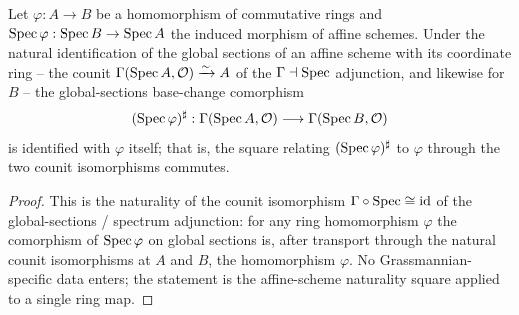 \begin{lemma}\label{mk-lem:gr_baseChange_bridge_gammaSpec}
  \leanok

  Let \(\varphi : A \to B\) be a homomorphism of commutative rings and
  \(\operatorname{Spec}\varphi : \operatorname{Spec} B \to \operatorname{Spec} A\) the induced morphism of affine schemes. Under the
  natural identification of the global sections of an affine scheme with its coordinate ring
  -- the counit \(\Gamma(\operatorname{Spec} A, \mathcal O) \xrightarrow{\sim} A\) of the
  \(\Gamma \dashv \operatorname{Spec}\) adjunction, and likewise for \(B\) -- the global-sections base-change
  comorphism
  \[
    (\operatorname{Spec}\varphi)^{\sharp} : \Gamma(\operatorname{Spec} A, \mathcal O) \longrightarrow \Gamma(\operatorname{Spec} B, \mathcal O)
  \]
  is identified with \(\varphi\) itself; that is, the square relating
  \((\operatorname{Spec}\varphi)^{\sharp}\) to \(\varphi\) through the two counit isomorphisms commutes.
\end{lemma}
\begin{proof}

  This is the naturality of the counit isomorphism \(\Gamma \circ \operatorname{Spec} \cong \mathrm{id}\) of
  the global-sections / spectrum adjunction: for any ring homomorphism \(\varphi\) the comorphism
  of \(\operatorname{Spec}\varphi\) on global sections is, after transport through the natural counit
  isomorphisms at \(A\) and \(B\), the homomorphism \(\varphi\). No Grassmannian-specific data
  enters; the statement is the affine-scheme naturality square applied to a single ring map.
\end{proof}


